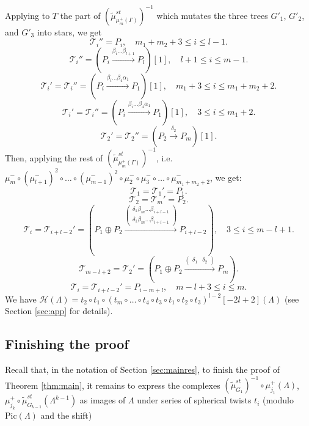 \documentclass[12pt]{amsart}
\theoremstyle{plain}
\theoremstyle{remark}
\theoremstyle{definition}
\newcommand{\Pic}{{\mathrm{Pic}}}
\begin{document}
\begin{enumerate}
\begin{enumerate}
\begin{center}
          \end{center}
            Applying to $T$ the part of $(\widetilde{\mu}_{\mu_m^+(\Gamma)}^{st})^{-1}$ which mutates the three trees $G'_1$, $G'_2$, and $G'_3$ into stars, we get 
            $$\mathcal{T}_i'' = P_i, \quad m_1+m_2+3 \leq i \leq l-1.$$      $$\mathcal{T}_i'' = (P_i \xrightarrow{\beta_i \dots \beta_{l+1}} P_l)[1], \quad l+1 \leq i \leq m-1. $$   
             $$\mathcal{T}_i' = \mathcal{T}_i'' = (P_i \xrightarrow{\beta_i \dots \beta_4 \alpha_1} P_1)[1], \quad m_1 + 3 \leq i \leq m_1+m_2+2. $$ 
          $$\mathcal{T}_i' = \mathcal{T}_i'' = (P_i \xrightarrow{\beta_i \dots \beta_4 \alpha_1} P_1)[1], \quad 3 \leq i \leq m_1+2.$$
          $$\mathcal{T}_2' = \mathcal{T}_{2}'' = (P_{2} \xrightarrow{\delta_2} P_{m})[1].$$
          Then, applying the rest of $(\widetilde{\mu}_{\mu_m^+(\Gamma)}^{st})^{-1}$, i.e. ${\mu_m^-\circ(\mu_{l+1}^-)^2 \circ \dots \circ (\mu_{m-1}^-)^2 \circ \mu_{2}^{-}\circ \mu_{3}^- \circ \dots \circ \mu_{m_1+m_2+2}^-}$, we get:
          $$\mathcal{T}_1 = \mathcal{T}_1' = P_1. $$
          $$\mathcal{T}_2 = \mathcal{T}_m' = P_2.$$ 
          $$\mathcal{T}_i = \mathcal{T}_{i+l-2}' = (P_1\oplus P_2 \xrightarrow{ \begin{pmatrix} \delta_1\beta_m \dots \beta_{i+l-1} \\ \delta_1\beta_m \dots \beta_{i+l-1} \end{pmatrix}} P_{i+l-2}), \quad 3 \leq i \leq m-l+1.$$ 
          $$\mathcal{T}_{m-l+2} = \mathcal{T}_2' = (P_1\oplus P_2 \xrightarrow{ \begin{pmatrix} \delta_1 & \delta_2 \end{pmatrix}} P_m).$$
          $$\mathcal{T}_i = \mathcal{T}_{i+l-2}' = P_{i-m+l}, \quad m-l+3 \leq i \leq m.$$ 
          We have $\mathcal{H}(\Lambda) = t_2 \circ t_1 \circ (t_m \circ \dots \circ t_4 \circ t_3 \circ t_1 \circ t_2 \circ t_3)^{l-2}[-2l+2](\Lambda)$ (see Section \ref{sec:app} for details).
 \end{enumerate}
 
    \end{enumerate}
    



\subsection{Finishing the proof}
Recall that, in the notation of Section \ref{sec:mainres}, to finish the proof of Theorem \ref{thm:main}, it remains to express the complexes $(\widetilde{\mu}_{G_1}^{st})^{-1} \circ \mu_{j_1}^+(\Lambda)$, $\mu_{j_k}^+ \circ \widetilde{\mu}_{G_{k-1}}^{st}(\Lambda^{k-1})$ as images of $\Lambda$ under series of spherical twists $t_i$ (modulo $\Pic(\Lambda)$ and the shift)
\end{document}
